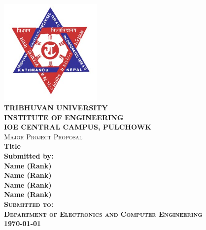 \begin{titlepage}

\newcommand{\HRule}{\rule{\linewidth}{0.3mm}}
\center

\includegraphics[width=50mm]{tu.jpg}\\
\textsc{\LARGE \bfseries TRIBHUVAN UNIVERSITY}\\[0.5cm] %
\textsc{\large \bfseries INSTITUTE OF ENGINEERING}\\
\textsc{\large \bfseries IOE CENTRAL CAMPUS, PULCHOWK}\\[0.5cm]
\textsc{Major Project Proposal} \\[0.2cm]
\Large \textbf{Title}\\[0.5cm]
\bfseries
Submitted by:\\
Name (Rank)\\
Name (Rank)\\
Name (Rank)\\
Name (Rank)\\[0.5cm]

\textsc{Submitted to:}\\
\textsc{Department of Electronics and Computer Engineering}
\\[0.4cm]

{\large \today}
\vfill
\end{titlepage}
